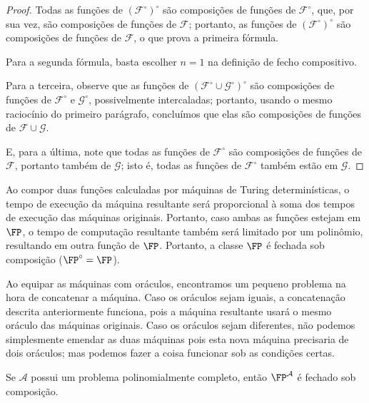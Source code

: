 \begin{proof}
    Todas as funções de $(\mathcal F^\circ)^\circ$
    são composições de funções de $\mathcal F^\circ$,
    que, por sua vez,
    são composições de funções de $\mathcal F$;
    portanto, as funções de $(\mathcal F^\circ)^\circ$
    são composições de funções de $\mathcal F$,
    o que prova a primeira fórmula.

    Para a segunda fórmula,
    basta escolher $n = 1$ na definição de fecho compositivo.

    Para a terceira,
    observe que as funções de $(\mathcal F^\circ \cup \mathcal G^\circ)^\circ$
    são composições de funções de $\mathcal F^\circ$ e $\mathcal G^\circ$,
    possivelmente intercaladas;
    portanto, usando o mesmo raciocínio do primeiro parágrafo,
    concluímos que elas são composições de funções de
    $\mathcal F \cup \mathcal G$.

    E, para a última,
    note que todas as funções de $\mathcal F^\circ$
    são composições de funções de $\mathcal F$,
    portanto também de $\mathcal G$;
    isto é, todas as funções de $\mathcal F^\circ$
    também estão em $\mathcal G$.
\end{proof}

Ao compor duas funções calculadas por máquinas de Turing determinísticas,
o tempo de execução da máquina resultante
será proporcional à soma dos tempos de execução das máquinas originais.
Portanto,
caso ambas as funções estejam em $\FP$,
o tempo de computação resultante também será limitado por um polinômio,
resultando em outra função de $\FP$.
Portanto,
a classe $\FP$ é fechada sob composição
($\FP^\circ = \FP$).

Ao equipar as máquinas com oráculos,
encontramos um pequeno problema na hora de concatenar a máquina.
Caso os oráculos sejam iguais,
a concatenação descrita anteriormente funciona,
pois a máquina resultante usará o mesmo oráculo das máquinas originais.
Caso os oráculos sejam diferentes,
não podemos simplesmente emendar as duas máquinas
pois esta nova máquina precisaria de dois oráculos;
mas podemos fazer a coisa funcionar sob as condições certas.

\begin{theorem}
    Se $\mathcal A$ possui um problema polinomialmente completo,
    então $\FP^\mathcal A$ é fechado sob composição.
    \label{thm:fp_closed_under_composition}
\end{theorem}

